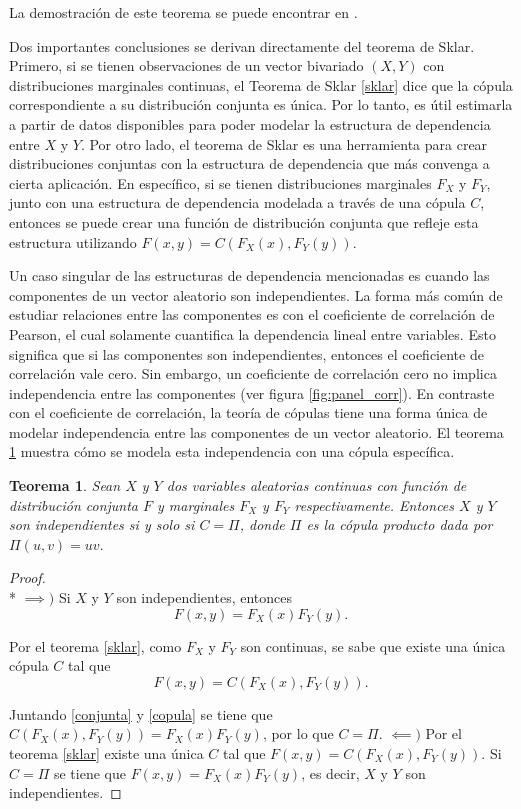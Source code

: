 \documentclass[11pt,a4paper]{article}
\newtheorem{theorem}{Teorema}[section]
\begin{document}
La demostración de este teorema se puede encontrar en \citet{nelsen}. 

Dos importantes conclusiones se derivan directamente del teorema de Sklar. Primero, si se tienen observaciones de un vector bivariado $(X, Y)$ con distribuciones marginales continuas, el Teorema de Sklar \eqref{sklar} dice que la cópula correspondiente a su distribución conjunta es única. Por lo tanto, es útil estimarla a partir de datos disponibles para poder modelar la estructura de dependencia entre $X$ y $Y$. Por otro lado, el teorema de Sklar es una herramienta para crear distribuciones conjuntas con la estructura de dependencia que más convenga a cierta aplicación. En específico, si se tienen distribuciones marginales $F_X$ y $F_Y$, junto con una estructura de dependencia modelada a través de una cópula $C$, entonces se puede crear una función de distribución conjunta que refleje esta estructura utilizando $F(x, y) = C (F_X(x), F_Y(y))$.

Un caso singular de las estructuras de dependencia mencionadas es cuando las componentes de un vector aleatorio son independientes. La forma más común de estudiar relaciones entre las componentes es con el coeficiente de correlación de Pearson, el cual solamente cuantifica la dependencia lineal entre variables. Esto significa que si las componentes son independientes, entonces el coeficiente de correlación vale cero. Sin embargo, un coeficiente de correlación cero no implica independencia entre las componentes (ver figura \ref{fig:panel_corr}). En contraste con el coeficiente de correlación, la teoría de cópulas tiene una forma única de modelar independencia entre las componentes de un vector aleatorio. El teorema \ref{independencia} muestra cómo se modela esta independencia con una cópula específica.

\begin{theorem}
\label{independencia}
Sean $X$ y $Y$ dos variables aleatorias continuas con función de distribución conjunta $F$ y marginales $F_X$ y $F_Y$ respectivamente. Entonces $X$ y $Y$ son independientes si y solo si $C = \Pi$, donde $\Pi$ es la cópula producto dada por $\Pi (u,v) = uv.$
\end{theorem}

\begin{proof}\mbox{}\\*
$\implies\big)$ Si $X$ y $Y$ son independientes, entonces
\begin{equation} \label{conjunta}
F(x, y) = F_X(x)F_Y(y).
\end{equation}

Por el teorema \ref{sklar}, como $F_X$ y $F_Y$ son continuas, se sabe que existe una única cópula $C$ tal que
\begin{equation} \label{copula}
F(x, y) = C(F_X(x), F_Y(y)).
\end{equation}

Juntando \eqref{conjunta} y \eqref{copula} se tiene que $C(F_X(x), F_Y(y)) = F_X(x)F_Y(y)$, por lo que $C = \Pi$.
\newpage
$\impliedby \big)$ Por el teorema \ref{sklar} existe una única $C$ tal que $F(x, y) = C(F_X(x), F_Y(y))$. Si $C = \Pi$ se tiene que $F(x, y) = F_X(x)F_Y(y)$, es decir, $X$ y $Y$ son independientes.
\end{proof}
\end{document}
